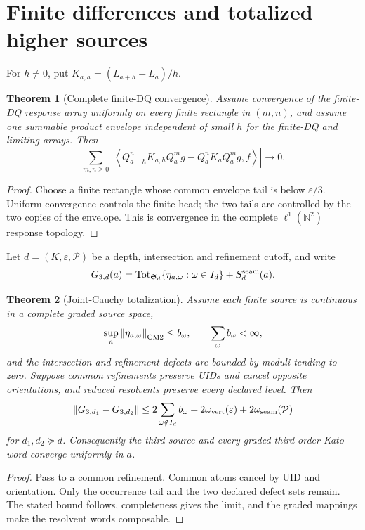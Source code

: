 \documentclass[11pt,reqno]{amsart}
\newtheorem{theorem}{Theorem}[section]
\theoremstyle{definition}
\theoremstyle{remark}
\newcommand{\N}{\mathbb N}
\newcommand{\Tot}{\operatorname{Tot}}
\newcommand{\norm}[1]{\left\lVert #1\right\rVert}
\newcommand{\abs}[1]{\left\lvert #1\right\rvert}
\newcommand{\pair}[2]{\left\langle #1,#2\right\rangle}
\begin{document}
\section{Finite differences and totalized higher sources}\label{sec:higher}

For $h\ne0$, put $K_{a,h}=(L_{a+h}-L_a)/h$.

\begin{theorem}[Complete finite-DQ convergence]\label{thm:fdq}
Assume convergence of the finite-DQ response array uniformly on every finite
rectangle in $(m,n)$, and assume one summable product envelope independent of
small $h$ for the finite-DQ and limiting arrays.  Then
\[
 \sum_{m,n\ge0}
 \abs{\pair{Q_{a+h}^nK_{a,h}Q_a^m g
 -Q_a^nK_aQ_a^m g}{f}}\longrightarrow0.
\]
\end{theorem}

\begin{proof}
Choose a finite rectangle whose common envelope tail is below
$\varepsilon/3$.  Uniform convergence controls the finite head; the two tails
are controlled by the two copies of the envelope.  This is convergence in the
complete $\ell^1(\N^2)$ response topology.
\end{proof}

Let $d=(K,\varepsilon,\mathcal P)$ be a depth, intersection and refinement
cutoff, and write
\[
 G_{3,d}(a)=
 \Tot_{\mathfrak S_d}\{\eta_{a,\omega}:\omega\in I_d\}
 +S_d^{\rm seam}(a).
\]

\begin{theorem}[Joint-Cauchy totalization]\label{thm:totalization}
Assume each finite source is continuous in a complete graded source space,
\[
 \sup_a\norm{\eta_{a,\omega}}_{\rm CM2}\le b_\omega,
 \qquad\sum_\omega b_\omega<\infty,
\]
and the intersection and refinement defects are bounded by moduli tending to
zero.  Suppose common refinements preserve UIDs and cancel opposite
orientations, and reduced resolvents preserve every declared level.  Then
\[
 \norm{G_{3,d_1}-G_{3,d_2}}
 \le2\sum_{\omega\notin I_d}b_\omega
 +2\omega_{\rm vert}(\varepsilon)
 +2\omega_{\rm seam}(\mathcal P)
\]
for $d_1,d_2\succeq d$.  Consequently the third source and every graded
third-order Kato word converge uniformly in $a$.
\end{theorem}

\begin{proof}
Pass to a common refinement.  Common atoms cancel by UID and orientation.
Only the occurrence tail and the two declared defect sets remain.  The stated
bound follows, completeness gives the limit, and the graded mappings make the
resolvent words composable.
\end{proof}
\end{document}
